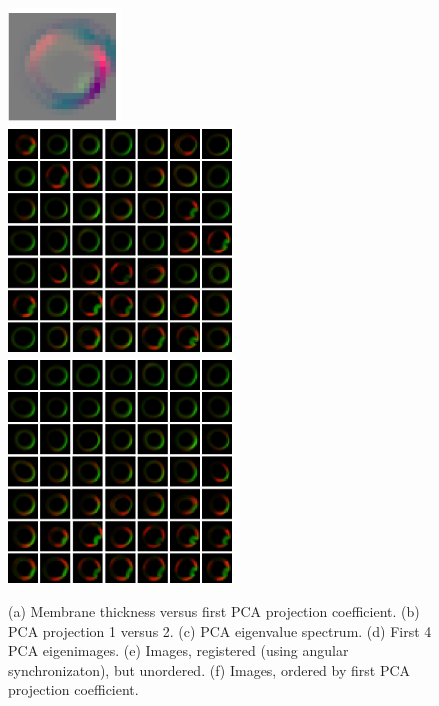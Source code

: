 \documentclass[12pt]{article}
\begin{document}
\begin{figure}
\includegraphics[width=3cm]{eigenimage_4}\\
\includegraphics[width=6cm]{image_array}
\includegraphics[width=6cm]{image_array_ordered}
\caption{(a) Membrane thickness versus first PCA projection coefficient. (b) PCA projection 1 versus 2. (c) PCA eigenvalue spectrum. (d) First 4 PCA eigenimages. (e) Images, registered (using angular synchronizaton), but unordered. (f) Images, ordered by first PCA projection coefficient. }
\end{figure}
\end{document}
